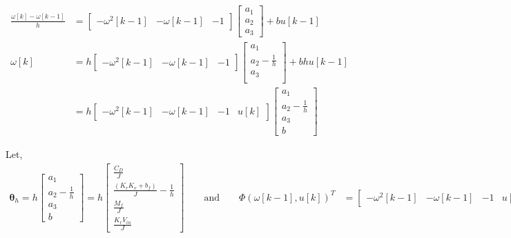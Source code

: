 \begin{align*}
    \frac{\omega[k] - \omega[k-1]}{h} &=
    \begin{bmatrix} - \omega^2[k-1] & - \omega[k-1]  &  -1 \end{bmatrix}
    \begin{bmatrix}
        a_1 \\ a_2 \\ a_3
    \end{bmatrix}
    + bu[k-1]\\
    \omega[k] &= h \begin{bmatrix} - \omega^2[k-1] & - \omega[k-1]  & -1 \end{bmatrix}
    \begin{bmatrix}
        a_1 \\
        a_2 - \frac{1}{h} \\
        a_3 \\
    \end{bmatrix}
    + b  h u[k-1]\\
    &= h \begin{bmatrix} - \omega^2[k-1] & -\omega[k-1] & -1 & u[k] \end{bmatrix}
    \begin{bmatrix}
        a_1 \\
        a_2 - \frac{1}{h} \\
        a_3 \\
        b
    \end{bmatrix}
\end{align*}

Let,
\begin{align*}
    \pmb \theta_h = h
    \begin{bmatrix}
        a_1 \\
        a_2 - \frac{1}{h} \\
        a_3 \\
        b
    \end{bmatrix} =
    h
    \begin{bmatrix}
        \frac{C_{D}}{J} \\
        \frac{(K_rK_v + b_f)}{J} - \frac{1}{h}  \\
        \frac{M_f}{J}\\
        \frac{K_r V_{in}}{J}
    \end{bmatrix}
    \qquad \text{and} \qquad
    \Phi(\omega[k-1], u[k])^T &=  \begin{bmatrix} - \omega^2[k-1] & -\omega[k-1] & -1 & u[k-1] \end{bmatrix}
\end{align*}


